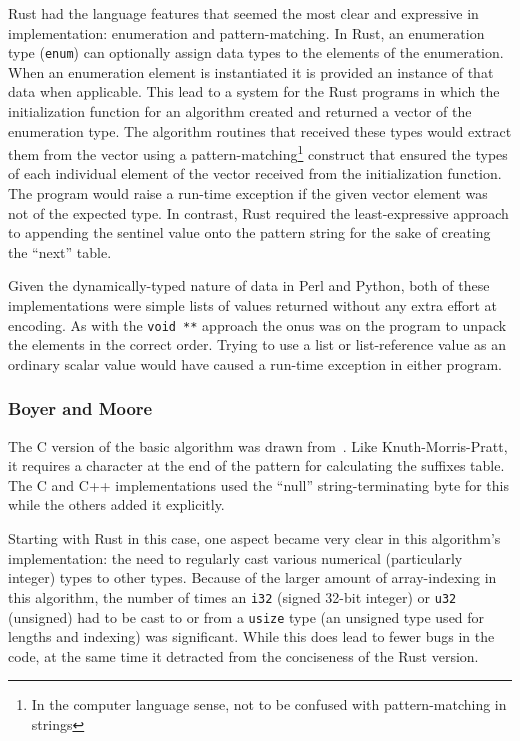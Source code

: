 Rust had the language features that seemed the most clear and expressive in implementation: enumeration and pattern-matching. In Rust, an enumeration type (\texttt{enum}) can optionally assign data types to the elements of the enumeration. When an enumeration element is instantiated it is provided an instance of that data when applicable. This lead to a system for the Rust programs in which the initialization function for an algorithm created and returned a vector of the enumeration type. The algorithm routines that received these types would extract them from the vector using a pattern-matching\footnote{In the computer language sense, not to be confused with pattern-matching in strings} construct that ensured the types of each individual element of the vector received from the initialization function. The program would raise a run-time exception if the given vector element was not of the expected type. In contrast, Rust required the least-expressive approach to appending the sentinel value onto the pattern string for the sake of creating the ``next'' table.

Given the dynamically-typed nature of data in Perl and Python, both of these implementations were simple lists of values returned without any extra effort at encoding. As with the \texttt{void **} approach the onus was on the program to unpack the elements in the correct order. Trying to use a list or list-reference value as an ordinary scalar value would have caused a run-time exception in either program.

\subsubsection{Boyer and Moore}

The C version of the basic algorithm was drawn from~\cite[Chapter 14]{handbook}. Like Knuth-Morris-Pratt, it requires a character at the end of the pattern for calculating the suffixes table. The C and C++ implementations used the ``null'' string-terminating byte for this while the others added it explicitly.

Starting with Rust in this case, one aspect became very clear in this algorithm's implementation: the need to regularly cast various numerical (particularly integer) types to other types. Because of the larger amount of array-indexing in this algorithm, the number of times an \texttt{i32} (signed 32-bit integer) or \texttt{u32} (unsigned) had to be cast to or from a \texttt{usize} type (an unsigned type used for lengths and indexing) was significant. While this does lead to fewer bugs in the code, at the same time it detracted from the conciseness of the Rust version.

